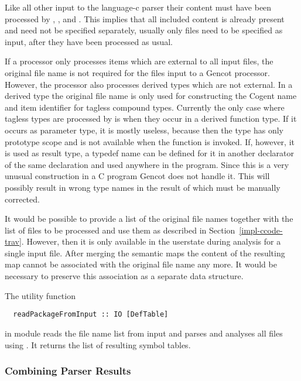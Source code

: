Like all other input to the language-c parser their content must have been processed by , 
, and . This implies that all included content is already present
and need not be specified separately, usually only  files need to be specified as input, after they have
been processed as usual.

If a processor only processes items which are external to all input files, the original file name is not required 
for the files input to a Gencot processor. However, the processor  also processes derived 
types which are not external. In a derived type the original file name is only used for constructing the Cogent name
and item identifier for tagless compound types. Currently the only case where tagless types are processed by 
 is when they occur in a derived function type. If it occurs as parameter type, it is mostly
useless, because then the type has only prototype scope and is not available when the function is invoked. If, however,
it is used as result type, a typedef name can be defined for it in another declarator of the same declaration and
used anywhere in the program. Since this is a very unusual construction in a C program Gencot does not handle it.
This will possibly result in wrong type names in the result of  which must be manually corrected.

It would be possible to provide a list of the original file names together with the list of files to be processed and
use them as described in Section~\ref{impl-ccode-trav}. However, then it is only available in the userstate during 
analysis for a single input file. After merging the semantic maps the content of the resulting map cannot be associated
with the original file name any more. It would be necessary to preserve this association as a separate data structure.

The utility function
\begin{verbatim}
  readPackageFromInput :: IO [DefTable]
\end{verbatim}
in module  reads the file name list from input and parses and analyses all files using 
. It returns the list of resulting symbol tables.

\subsubsection{Combining Parser Results}

